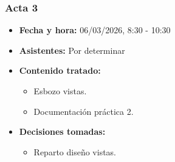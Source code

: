 \documentclass[12pt,a4paper]{article}
\begin{document}
\subsubsection{Acta 3}
\begin{itemize}
    \item \textbf{Fecha y hora: } 06/03/2026, 8:30 - 10:30
    \item \textbf{Asistentes: } Por determinar
    \item \textbf{Contenido tratado: }
    \begin{itemize}
        \item Esbozo vistas.
        \item Documentación práctica 2.
    \end{itemize}
    \item \textbf{Decisiones tomadas: }
    \begin{itemize}
        \item Reparto diseño vistas.
    \end{itemize}
\end{itemize}
\end{document}
